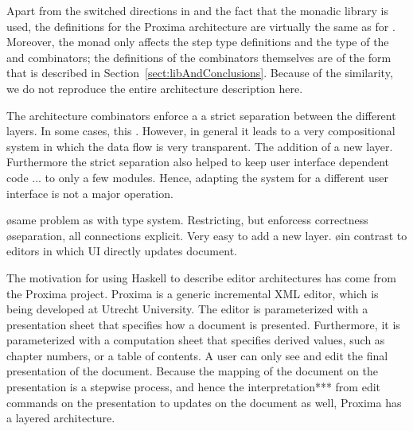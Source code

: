 Apart from the switched directions in  and the fact that the monadic library is used, the definitions for the Proxima architecture are virtually the same as for . Moreover, the monad only affects the step type definitions and the type of the  and  combinators; the definitions of the combinators themselves are of the form that is described in Section~\ref{sect:libAndConclusions}. Because of the similarity, we do not reproduce the entire architecture description here.

\bc
\bigskip

The architecture combinators enforce a a strict separation between the different layers. In some cases, this . However, in general it leads to a very compositional system in which the data flow is very transparent. The addition of a new layer. Furthermore the strict separation also helped to keep user interface dependent code ... to only a few modules. Hence, adapting the system for a different user interface is not a major operation.

\bl
\o same problem as with type system. Restricting, but enforcess correctness
\o separation, all connections explicit. Very easy to add a new layer. 
\o in contrast to editors in which UI directly updates document.
\el
\ec

\bc
The motivation for using Haskell to describe editor architectures has come from the Proxima project. Proxima is a generic incremental XML editor, which is being developed at Utrecht University. The editor is parameterized with a presentation sheet that specifies how a document is presented. Furthermore, it is parameterized with a computation sheet that specifies derived values, such as chapter numbers, or a table of contents. A user can only see and edit the final presentation of the document. Because the mapping of the document on the presentation is a stepwise process, and hence the interpretation*** from edit commands on the presentation to updates on the document as well, Proxima has a layered architecture.
\ec

